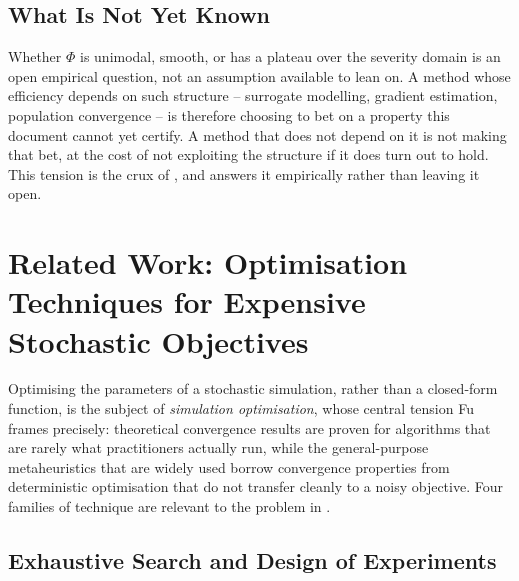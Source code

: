 \documentclass{article}
\begin{document}
\subsection{What Is Not Yet Known}

Whether $\Phi$ is unimodal, smooth, or has a plateau over the severity domain
is an open empirical question, not an assumption available to lean on. A
method whose efficiency depends on such structure -- surrogate modelling,
gradient estimation, population convergence -- is therefore choosing to bet on
a property this document cannot yet certify. A method that does not depend on
it is not making that bet, at the cost of not exploiting the structure if it
does turn out to hold. This tension is the crux of , and
 answers it empirically rather than leaving it open.

\section{Related Work: Optimisation Techniques for Expensive Stochastic Objectives}
\label{sec:related-work}

Optimising the parameters of a stochastic simulation, rather than a
closed-form function, is the subject of \emph{simulation optimisation}, whose
central tension Fu~\cite{fu2002optimization} frames precisely: theoretical
convergence results are proven for algorithms that are rarely what
practitioners actually run, while the general-purpose metaheuristics that are
widely used borrow convergence properties from deterministic optimisation that
do not transfer cleanly to a noisy objective. Four families of technique are
relevant to the problem in .

\subsection{Exhaustive Search and Design of Experiments}
\end{document}
